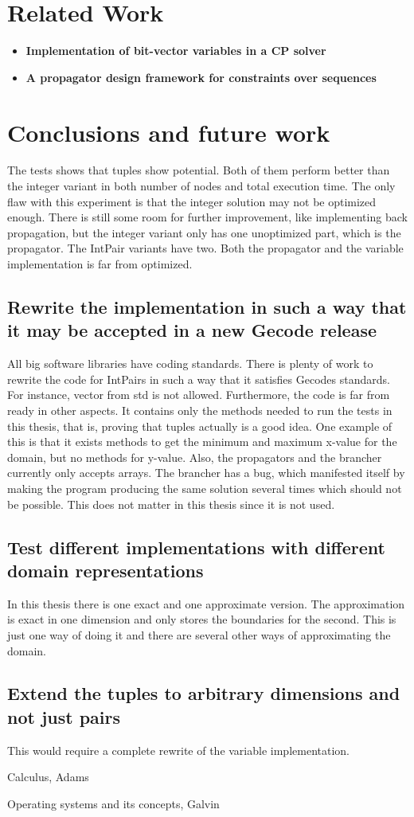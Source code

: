 \documentclass[a4paper,11pt]{article}
\begin{document}
\section{Related Work}
\begin{itemize}
\item{\textbf{Implementation of bit-vector variables in a CP solver}}
\item{\textbf{A propagator design framework for constraints over sequences}}
\end{itemize}

\section{Conclusions and future work}
The tests shows that tuples show potential. Both of them perform better than the integer variant in both number of nodes and total execution time. The only flaw with this experiment is that the integer solution may not be optimized enough. There is still some room for further improvement, like implementing back propagation, but the integer variant only has one unoptimized part, which is the propagator. The IntPair variants have two. Both the propagator and the variable implementation is far from optimized. 

\subsection{Rewrite the implementation in such a way that it may be accepted in a new Gecode release}
All big software libraries have coding standards. There is plenty of work to rewrite the code for IntPairs in such a way that it satisfies Gecodes standards. For instance, vector from std is not allowed. Furthermore, the code is far from ready in other aspects. It contains only the methods needed to run the tests in this thesis, that is, proving that tuples actually is a good idea. One example of this is that it exists methods to get the minimum and maximum x-value for the domain, but no methods for y-value. Also, the propagators and the brancher currently only accepts arrays. The brancher has a bug, which manifested itself by making the program producing the same solution several times which should not be possible. This does not matter in this thesis since it is not used.

\subsection{Test different implementations with different domain representations}
In this thesis there is one exact and one approximate version. The approximation is exact in one dimension and only stores the boundaries for the second. This is just one way of doing it and there are several other ways of approximating the domain.

\subsection{Extend the tuples to arbitrary dimensions and not just pairs}
This would require a complete rewrite of the variable implementation.

\begin{thebibliography}{99}
	Calculus, 
	Adams
	
	Operating systems and its concepts,
	Galvin
\end{thebibliography}
\end{document}
